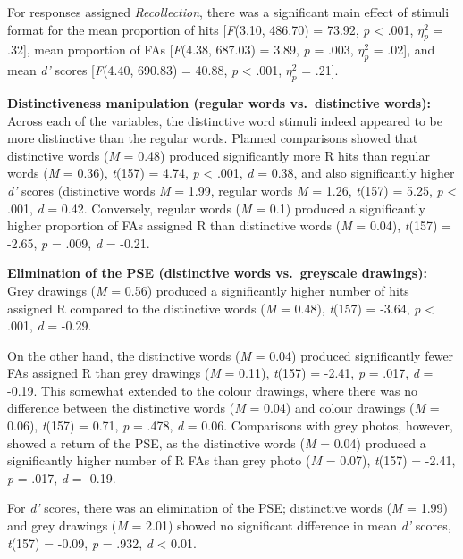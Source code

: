 \documentclass[
  11pt,
]{article}
\begin{document}
\newpage

For responses assigned \emph{Recollection}, there was a significant main
effect of stimuli format for the mean proportion of hits
{[}\emph{F}(3.10, 486.70) = 73.92, \emph{p} \textless{} .001,
\(\eta^2_p\) = .32{]}, mean proportion of FAs {[}\emph{F}(4.38, 687.03)
= 3.89, \emph{p} = .003, \(\eta^2_p\) = .02{]}, and mean \emph{d'}
scores {[}\emph{F}(4.40, 690.83) = 40.88, \emph{p} \textless{} .001,
\(\eta^2_p\) = .21{]}.

\textbf{Distinctiveness manipulation (regular words vs.~distinctive
words):} Across each of the variables, the distinctive word stimuli
indeed appeared to be more distinctive than the regular words. Planned
comparisons showed that distinctive words (\emph{M} = 0.48) produced
significantly more R hits than regular words (\emph{M} = 0.36),
\emph{t}(157) = 4.74, \emph{p} \textless{} .001, \emph{d} = 0.38, and
also significantly higher \emph{d'} scores (distinctive words \emph{M} =
1.99, regular words \emph{M} = 1.26, \emph{t}(157) = 5.25, \emph{p}
\textless{} .001, \emph{d} = 0.42. Conversely, regular words (\emph{M} =
0.1) produced a significantly higher proportion of FAs assigned R than
distinctive words (\emph{M} = 0.04), \emph{t}(157) = -2.65, \emph{p} =
.009, \emph{d} = -0.21.

\textbf{Elimination of the PSE (distinctive words vs.~greyscale
drawings):} Grey drawings (\emph{M} = 0.56) produced a significantly
higher number of hits assigned R compared to the distinctive words
(\emph{M} = 0.48), \emph{t}(157) = -3.64, \emph{p} \textless{} .001,
\emph{d} = -0.29.

On the other hand, the distinctive words (\emph{M} = 0.04) produced
significantly fewer FAs assigned R than grey drawings (\emph{M} = 0.11),
\emph{t}(157) = -2.41, \emph{p} = .017, \emph{d} = -0.19. This somewhat
extended to the colour drawings, where there was no difference between
the distinctive words (\emph{M} = 0.04) and colour drawings (\emph{M} =
0.06), \emph{t}(157) = 0.71, \emph{p} = .478, \emph{d} = 0.06.
Comparisons with grey photos, however, showed a return of the PSE, as
the distinctive words (\emph{M} = 0.04) produced a significantly higher
number of R FAs than grey photo (\emph{M} = 0.07), \emph{t}(157) =
-2.41, \emph{p} = .017, \emph{d} = -0.19.

For \emph{d'} scores, there was an elimination of the PSE; distinctive
words (\emph{M} = 1.99) and grey drawings (\emph{M} = 2.01) showed no
significant difference in mean \emph{d'} scores, \emph{t}(157) = -0.09,
\emph{p} = .932, \emph{d} \textless{} 0.01.
\end{document}

